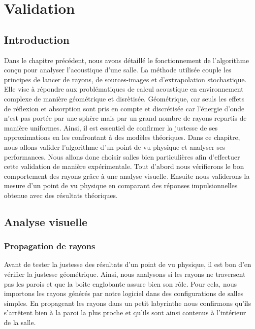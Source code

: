 \chapter{Validation}
	\minitoc
	\newpage
	
\section*{Introduction}

Dans le chapitre précédent, nous avons détaillé le fonctionnement de l'algorithme conçu pour analyser l'acoustique d'une salle. La méthode utilisée couple les principes de lancer de rayons, de sources-images et d'extrapolation stochastique. Elle vise à répondre aux problématiques de calcul acoustique en environnement complexe de manière géométrique et disrètisée. Géométrique, car seuls les effets de réflexion et absorption sont pris en compte et discrétisée car l'énergie d'onde n'est pas portée par une sphère mais par un grand nombre de rayons repartis de manière uniformes. Ainsi, il est essentiel de confirmer la justesse de ses approximations en les confrontant à des modèles théoriques. Dans ce chapitre, nous allons valider l'algorithme d'un point de vu physique et analyser ses performances. Nous allons donc choisir salles bien particulières afin d'effectuer cette validation de manière expérimentale. Tout d'abord nous vérifierons le bon comportement des rayons grâce à une analyse visuelle. Ensuite nous validerons la mesure d'un point de vu physique en comparant des réponses impulsionnelles obtenue avec des résultats théoriques.

\section{Analyse visuelle}
\subsection{Propagation de rayons}

Avant de tester la justesse des résultats d'un point de vu physique, il est bon d'en vérifier la justesse géométrique. Ainsi, nous analysons si les rayons ne traversent pas les parois et que la boite englobante assure bien son rôle. Pour cela, nous importons les rayons générés par notre logiciel dans des configurations de salles simples. En propageant les rayons dans un petit labyrinthe nous confirmons qu'ils s'arrêtent bien à la paroi la plus proche et qu'ils sont ainsi contenus à l'intérieur de la salle. 


